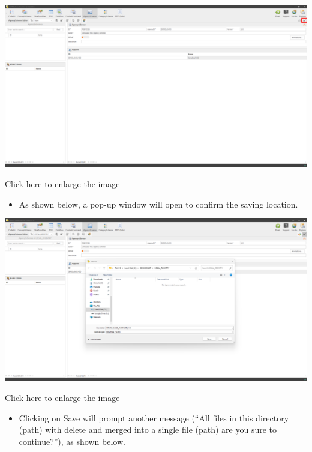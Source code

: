 \documentclass[
]{book}
\providecommand{\tightlist}{%
  \setlength{\itemsep}{0pt}\setlength{\parskip}{0pt}}
\theoremstyle{definition}
\theoremstyle{definition}
\theoremstyle{definition}
\theoremstyle{definition}
\theoremstyle{remark}
\begin{document}
\begin{center}\includegraphics[width=1\linewidth]{./images/image072} \end{center}

\href{images/image072.png}{Click here to enlarge the image}

\begin{itemize}
\tightlist
\item
  As shown below, a pop-up window will open to confirm the saving location.
\end{itemize}

\begin{center}\includegraphics[width=1\linewidth]{./images/image074} \end{center}

\href{images/image074.png}{Click here to enlarge the image}

\begin{itemize}
\tightlist
\item
  Clicking on Save will prompt another message (``All files in this directory (path) with delete and merged into a single file (path) are you sure to continue?''), as shown below.
\end{itemize}
\end{document}
